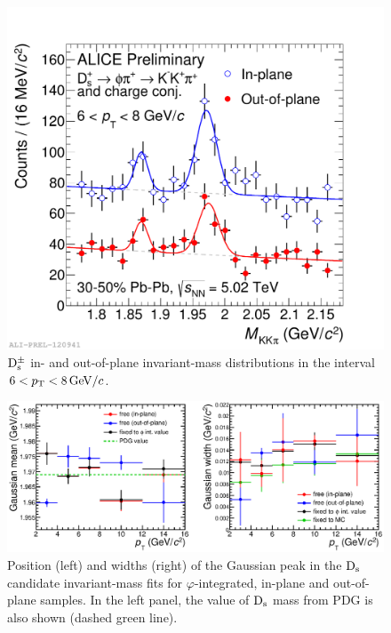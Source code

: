\begin{figure}
\centering
 \includegraphics[width=.7\textwidth]{FigCap5/MassDsInOutOfPlane_PbPb3050_5TeV_pt6-8.pdf}
\caption{${\rm D_s^{\pm}}$ in- and out-of-plane invariant-mass distributions in the interval $6 < p_{\rm T} <8 \, \mathrm{GeV}/c$.}
\label{fig:deltaphibinsds}
\end{figure}
\begin{figure}
\centering
 \includegraphics[width=.98\textwidth]{FigCap5/sigmaComparison.eps}
\caption{Position (left) and widths (right) of the Gaussian peak in the ${\rm D_s}$ candidate invariant-mass fits for $\varphi$-integrated, in-plane and out-of-plane samples. In the left panel, the value of ${\rm D_s}$ mass from PDG is also shown (dashed green line).}
\label{fig:deltaphibinsds}
\end{figure}

